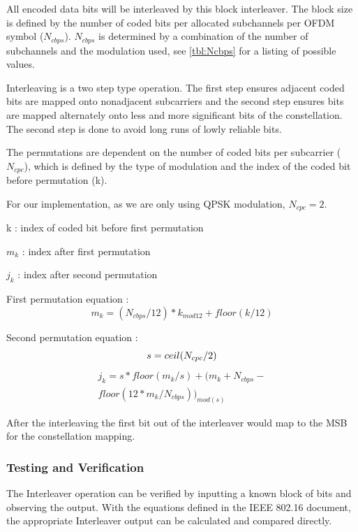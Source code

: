 \documentclass[dvips,10pt,twocolumn]{article}
\begin{document}
All encoded data bits will be interleaved by this block interleaver. The
block size is defined by the number of coded bits per allocated subchannels 
per OFDM symbol ($N_{cbps}$). $N_{cbps}$ is determined by a
combination of the number of subchannels and the modulation used, see
\autoref{tbl:Ncbps} for a listing of possible values.

Interleaving is a two step type operation. The first step ensures adjacent 
coded bits are mapped onto nonadjacent subcarriers and the second step 
ensures bits are mapped alternately onto less and more significant bits of
the constellation. The second step is done to avoid long runs of lowly
reliable bits.
 
The permutations are dependent on the number of coded bits per subcarrier
($N_{cpc}$), which is defined by the type of modulation and the index of the
coded bit before permutation (k).

For our implementation, as we are only using QPSK modulation,
$N_{cpc} = 2$.

k : index of coded bit before first permutation

$m_{k}$ : index after first permutation

$j_{k}$ : index after second permutation 

First permutation equation :
\begin{equation}
m_k = (N_{cbps}/12)*k_{mod12}+floor(k/12)
\end{equation}

Second permutation equation :
\begin{equation}
s=ceil(N_{cpc}/2) \\
\end{equation}
\begin{eqnarray}
j_k = s*floor(m_{k}/s)+(m_{k}+N_{cbps}- \nonumber \\
	floor(12*m_k/N_{cbps}))_{mod(s)}
\end{eqnarray}

After the interleaving the first bit out of the interleaver would map to the
MSB for the constellation mapping. 

  \subsubsection{Testing and Verification}
  
  The Interleaver operation can be verified by inputting a known block of bits
  and observing the output. With the equations defined in the IEEE 802.16
  document, the appropriate Interleaver output can be calculated and compared
  directly. 
  
\end{document}
